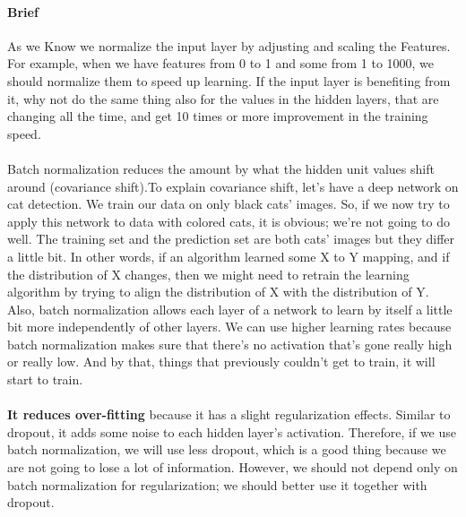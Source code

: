 
\paragraph{Brief}
As we Know we normalize the input layer by adjusting and scaling the Features. For example, when we have features from 0 to 1 and some from 1 to 1000, we should normalize them to speed up learning. If the input layer is benefiting from it, why not do the same thing also for the values in the hidden layers, that are changing all the time, and get 10 times or more improvement in the training speed.
\paragraph{}
Batch normalization reduces the amount by what the hidden unit values shift around (covariance shift).To explain covariance shift, let’s have a deep network on cat detection. We train our data on only black cats’ images. So, if we now try to apply this network to data with colored cats, it is obvious; we’re not going to do well. The training set and the prediction set are both cats’ images but they differ a little bit. In other words, if an algorithm learned some X to Y mapping, and if the distribution of X changes, then we might need to retrain the learning algorithm by trying to align the distribution of X with the distribution of Y. \newline
Also, batch normalization allows each layer of a network to learn by itself a little bit more independently of other layers.
We can use higher learning rates because batch normalization makes sure that there’s no activation that’s gone really high or really low. And by that, things that previously couldn’t get to train, it will start to train.

\paragraph{}
\textbf{It reduces over-fitting}
because it has a slight regularization effects. Similar to dropout, it adds some noise to each hidden layer’s activation. Therefore, if we use batch normalization, we will use less dropout, which is a good thing because we are not going to lose a lot of information. However, we should not depend only on batch normalization for regularization; we should better use it together with dropout.